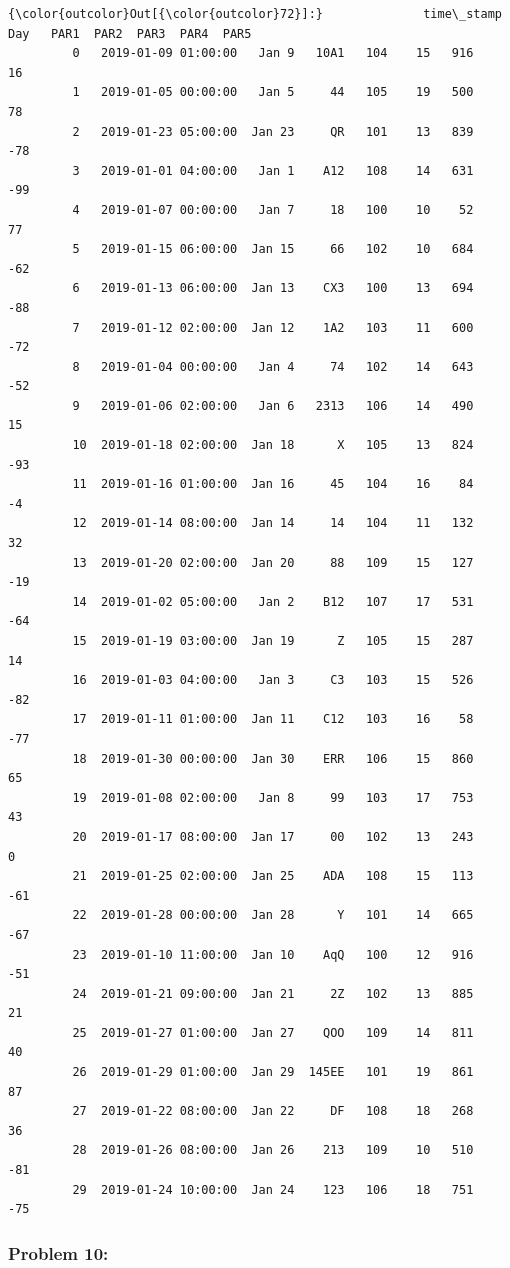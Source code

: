 \documentclass[11pt]{article}
\begin{document}
\begin{Verbatim}[commandchars=\\\{\}]
{\color{outcolor}Out[{\color{outcolor}72}]:}              time\_stamp     Day   PAR1  PAR2  PAR3  PAR4  PAR5
         0   2019-01-09 01:00:00   Jan 9   10A1   104    15   916    16
         1   2019-01-05 00:00:00   Jan 5     44   105    19   500    78
         2   2019-01-23 05:00:00  Jan 23     QR   101    13   839   -78
         3   2019-01-01 04:00:00   Jan 1    A12   108    14   631   -99
         4   2019-01-07 00:00:00   Jan 7     18   100    10    52    77
         5   2019-01-15 06:00:00  Jan 15     66   102    10   684   -62
         6   2019-01-13 06:00:00  Jan 13    CX3   100    13   694   -88
         7   2019-01-12 02:00:00  Jan 12    1A2   103    11   600   -72
         8   2019-01-04 00:00:00   Jan 4     74   102    14   643   -52
         9   2019-01-06 02:00:00   Jan 6   2313   106    14   490    15
         10  2019-01-18 02:00:00  Jan 18      X   105    13   824   -93
         11  2019-01-16 01:00:00  Jan 16     45   104    16    84    -4
         12  2019-01-14 08:00:00  Jan 14     14   104    11   132    32
         13  2019-01-20 02:00:00  Jan 20     88   109    15   127   -19
         14  2019-01-02 05:00:00   Jan 2    B12   107    17   531   -64
         15  2019-01-19 03:00:00  Jan 19      Z   105    15   287    14
         16  2019-01-03 04:00:00   Jan 3     C3   103    15   526   -82
         17  2019-01-11 01:00:00  Jan 11    C12   103    16    58   -77
         18  2019-01-30 00:00:00  Jan 30    ERR   106    15   860    65
         19  2019-01-08 02:00:00   Jan 8     99   103    17   753    43
         20  2019-01-17 08:00:00  Jan 17     00   102    13   243     0
         21  2019-01-25 02:00:00  Jan 25    ADA   108    15   113   -61
         22  2019-01-28 00:00:00  Jan 28      Y   101    14   665   -67
         23  2019-01-10 11:00:00  Jan 10    AqQ   100    12   916   -51
         24  2019-01-21 09:00:00  Jan 21     2Z   102    13   885    21
         25  2019-01-27 01:00:00  Jan 27    QOO   109    14   811    40
         26  2019-01-29 01:00:00  Jan 29  145EE   101    19   861    87
         27  2019-01-22 08:00:00  Jan 22     DF   108    18   268    36
         28  2019-01-26 08:00:00  Jan 26    213   109    10   510   -81
         29  2019-01-24 10:00:00  Jan 24    123   106    18   751   -75
\end{Verbatim}
            
    \subsubsection{Problem 10:}\label{problem-10}
\end{document}
